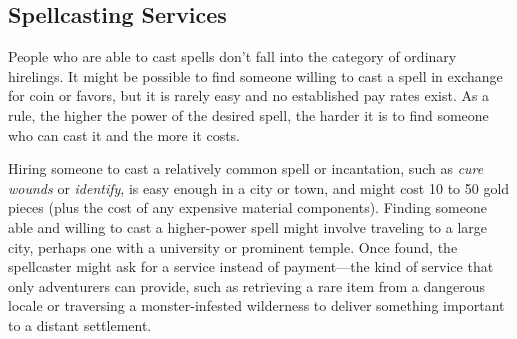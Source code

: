 \subsection{Spellcasting Services}

People who are able to cast spells don't fall into the category of ordinary hirelings. It might be possible to find someone willing to cast a spell in exchange for coin or favors, but it is rarely easy and no established pay rates exist. As a rule, the higher the power of the desired spell, the harder it is to find someone who can cast it and the more it costs.

Hiring someone to cast a relatively common spell or incantation, such as \textit{cure wounds} or \textit{identify}, is easy enough in a city or town, and might cost 10 to 50 gold pieces (plus the cost of any expensive material components). Finding someone able and willing to cast a higher-power spell might involve traveling to a large city, perhaps one with a university or prominent temple. Once found, the spellcaster might ask for a service instead of payment—the kind of service that only adventurers can provide, such as retrieving a rare item from a dangerous locale or traversing a monster-infested wilderness to deliver something important to a distant settlement.
